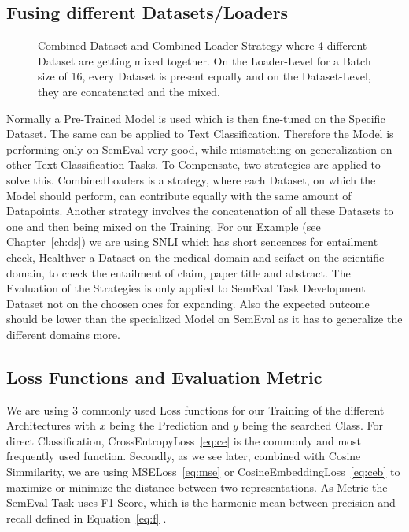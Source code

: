 \subsection{Fusing different Datasets/Loaders}
\begin{figure}[h]
    \centering
    \resizebox{\textwidth}{!}{}
    \caption{Combined Dataset and Combined Loader Strategy where 4 different Dataset are getting mixed together.
             On the Loader-Level for a Batch size of 16, every Dataset is present equally and on the
             Dataset-Level, they are concatenated and the mixed.}\label{fig:test}
\end{figure}
Normally a Pre-Trained Model is used which is then fine-tuned on the Specific Dataset. The same can be applied to
Text Classification. Therefore the Model is performing only on SemEval very good, while mismatching on generalization
on other Text Classification Tasks. To Compensate, two strategies are applied to solve this.
CombinedLoaders is a strategy, where each Dataset, on which the Model should perform, can contribute equally with
the same amount of Datapoints. Another strategy involves the concatenation of all these Datasets to one and then being
mixed on the Training. For our Example (see Chapter~\ref{ch:ds}) we are using SNLI \cite{noauthor_snli_2023}
which has short sencences for entailment check, Healthver \cite{noauthor_dwaddenhealthver_entailment_nodate} a Dataset on the medical domain and
scifact \cite{noauthor_allenaiscifact_entailment_nodate} on the scientific domain, to check the entailment of claim, 
paper title and abstract. The Evaluation of the Strategies is only applied to SemEval Task Development
Dataset not on the choosen ones for expanding. Also the expected outcome should be lower than the
specialized Model on SemEval as it has to generalize the different domains more.























\subsection{Loss Functions and Evaluation Metric}
We are using 3 commonly used Loss functions for our Training of the different
Architectures with $x$ being the Prediction and $y$ being the searched Class. For direct Classification, 
CrossEntropyLoss~\ref{eq:ce} is the commonly and most frequently used function. Secondly, as we see later,
combined with Cosine Simmilarity, we are using MSELoss~\ref{eq:mse} or CosineEmbeddingLoss~\ref{eq:ceb}
to maximize or minimize the distance between two representations. As Metric the SemEval Task uses F1 Score, which
is the harmonic mean between precision and recall defined in Equation~\ref{eq:f} \cite{noauthor_nli4ct_nodate}.



